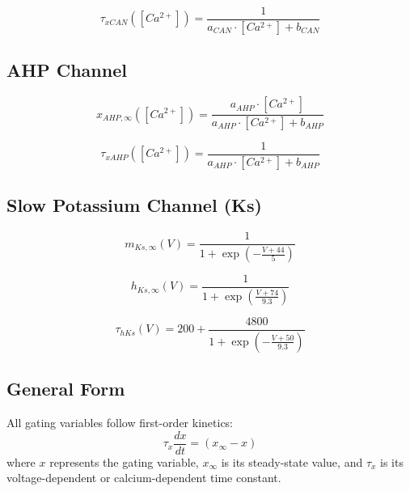 \documentclass{article}
\begin{document}
\begin{equation}
\tau_{xCAN}([Ca^{2+}]) = \frac{1}{a_{CAN} \cdot [Ca^{2+}] + b_{CAN}}
\end{equation}

\subsection*{AHP Channel}
\begin{equation}
x_{AHP,\infty}([Ca^{2+}]) = \frac{a_{AHP} \cdot [Ca^{2+}]}{a_{AHP} \cdot [Ca^{2+}] + b_{AHP}}
\end{equation}

\begin{equation}
\tau_{xAHP}([Ca^{2+}]) = \frac{1}{a_{AHP} \cdot [Ca^{2+}] + b_{AHP}}
\end{equation}

\subsection*{Slow Potassium Channel (Ks)}
\begin{equation}
m_{Ks,\infty}(V) = \frac{1}{1 + \exp\left(-\frac{V + 44}{5}\right)}
\end{equation}

\begin{equation}
h_{Ks,\infty}(V) = \frac{1}{1 + \exp\left(\frac{V + 74}{9.3}\right)}
\end{equation}

\begin{equation}
\tau_{hKs}(V) = 200 + \frac{4800}{1 + \exp\left(-\frac{V + 50}{9.3}\right)}
\end{equation}

\subsection*{General Form}
All gating variables follow first-order kinetics:
\begin{equation}
\tau_x \frac{dx}{dt} = (x_{\infty} - x)
\end{equation}
where $x$ represents the gating variable, $x_{\infty}$ is its steady-state value, and $\tau_x$ is its voltage-dependent or calcium-dependent time constant.
\end{document}
